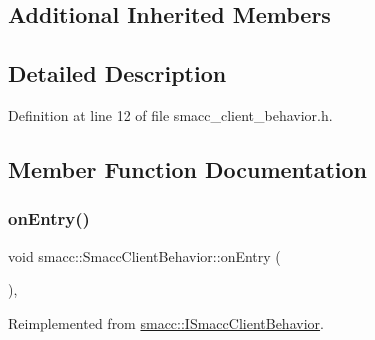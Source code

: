 \subsection*{Additional Inherited Members}


\subsection{Detailed Description}


Definition at line 12 of file smacc\+\_\+client\+\_\+behavior.\+h.



\subsection{Member Function Documentation}
\mbox{\label{classsmacc_1_1SmaccClientBehavior_ad5d3e1f1697c3cfe66c94cadba948493}} 
\subsubsection{\texorpdfstring{on\+Entry()}{onEntry()}}
{\footnotesize\ttfamily void smacc\+::\+Smacc\+Client\+Behavior\+::on\+Entry (\begin{DoxyParamCaption}{ }\end{DoxyParamCaption})\hspace{0.3cm}{\ttfamily [override]}, {\ttfamily [virtual]}}



Reimplemented from \hyperlink{classsmacc_1_1ISmaccClientBehavior_a3ec24a839087c550e1d62a81e48cf530}{smacc\+::\+I\+Smacc\+Client\+Behavior}.



